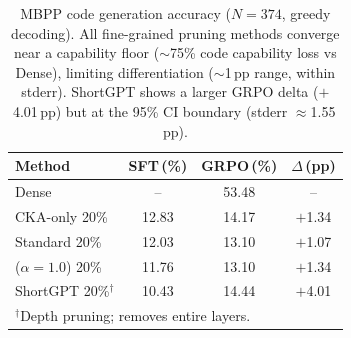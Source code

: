 \begin{table}[h]
\centering
\small
\caption{MBPP code generation accuracy ($N{=}374$, greedy decoding). All fine-grained pruning methods converge near a capability floor (${\sim}$75\% code capability loss vs Dense), limiting differentiation (${\sim}$1\,pp range, within stderr). ShortGPT shows a larger GRPO delta ($+$4.01\,pp) but at the 95\% CI boundary (stderr ${\approx}$1.55\,pp).}
\label{tab:mbpp}
\begin{tabular}{@{}lccc@{}}
\toprule
Method & SFT\,(\%) & GRPO\,(\%) & $\Delta$\,(pp) \\
\midrule
Dense & -- & 53.48 & -- \\
\midrule
CKA-only 20\% & 12.83 & 14.17 & $+$1.34 \\
Standard 20\% & 12.03 & 13.10 & $+$1.07 \\
\rasp{} ($\alpha{=}1.0$) 20\% & 11.76 & 13.10 & $+$1.34 \\
\midrule
ShortGPT 20\%$^\dagger$ & 10.43 & 14.44 & $+$4.01 \\
\bottomrule
\multicolumn{4}{l}{\footnotesize $^\dagger$Depth pruning; removes entire layers.}
\end{tabular}
\end{table}

